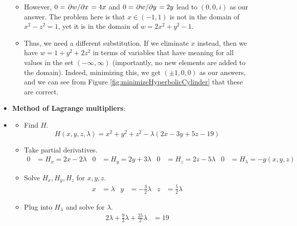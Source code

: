 \documentclass[../main.tex]{subfiles}
\begin{document}
\begin{itemize}
\begin{itemize}
        \item However, $0=\pdv*{w}{x}=4x$ and $0=\pdv*{w}{y}=2y$ lead to $(0,0,i)$ as our answer. The problem here is that $x\in(-1,1)$ is not in the domain of $x^2-z^2=1$, yet it is in the domain of $w=2x^2+y^2-1$.
        \item Thus, we need a different substitution. If we eliminate $x$ instead, then we have $w=1+y^2+2z^2$ in terms of variables that have meaning for all values in the set $(-\infty,\infty)$ (importantly, no new elements are added to the domain). Indeed, minimizing this, we get $(\pm 1,0,0)$ as our answers, and we can see from Figure \ref{fig:minimizeHyperbolicCylinder} that these are correct.
    \end{itemize}
    \item \textbf{Method of Lagrange multipliers}: 
    \item {}
    \begin{itemize}
        \item Find $H$.
        \begin{equation*}
            H(x,y,z,\lambda) = x^2+y^2+z^2-\lambda(2x-3y+5z-19)
        \end{equation*}
        \item Take partial derivatives.
        \begin{align*}
            0 &= H_x = 2x-2\lambda&
                0 &= H_y = 2y+3\lambda&
                    0 &= H_z = 2z-5\lambda&
                        0 &= H_\lambda = -g(x,y,z)
        \end{align*}
        \item Solve $H_x,H_y,H_z$ for $x,y,z$.
        \begin{align*}
            x &= \lambda&
                y &= -\frac{3}{2}\lambda&
                    z &= \frac{5}{2}\lambda
        \end{align*}
        \item Plug into $H_\lambda$ and solve for $\lambda$.
        \begin{align*}
            2\lambda+\frac{9}{2}\lambda+\frac{25}{2}\lambda &= 19\\

\end{align*}
\end{itemize}
\end{itemize}
\end{document}
